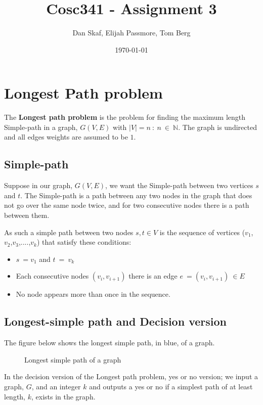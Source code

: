 \documentclass[a4paper,11pt]{article}
\title{Cosc341 - Assignment 3}
\author{Dan Skaf, Elijah Passmore, Tom Berg}
\date{\today}
\begin{document}
\maketitle

\section{Longest Path problem}
The \textbf{Longest path problem} is the problem for finding the maximum length 
Simple-path in a graph, $G(V,E)$ with $\left|V\right|=n\::\:n\:\in\:\mathbb{N}$.
The graph is undirected and all edges weights are assumed to be $1$.

    \subsection{Simple-path} 
    Suppose in our graph, $G(V,E)$, we want the Simple-path between two vertices 
    $s$ and $t$. The Simple-path is a path between any two nodes in the graph 
    that does not go over the same node twice, and for two consecutive nodes 
    there is a path between them.

    As such a simple path between two nodes $s,t\in V$ is the sequence of 
    vertices ($v_1$,$v_2$,$v_3$,$....$,$v_k$) that satisfy these conditions:
    \begin{itemize}
        \item $s\:=v_1$ and $t\:=\:v_k$
        \item Each consecutive nodes $\left(v_i,v_{i+1}\right)$ there is an 
        edge $e\:=\left(v_i,v_{i+1}\right)\:\in E$
        \item No node appears more than once in the sequence.
    \end{itemize}

    \subsection{Longest-simple path and Decision version}
    The figure below shows the longest simple path, in blue, of a graph.
    \begin{figure}[!h]
        \centering {}
        \caption{Longest simple path of a graph}
    \end{figure}

    In the decision version of the Longest path problem, yes or no version; 
    we input a graph, $G$, and an integer $k$ and outputs a yes or no if a 
    simplest path of at least length, $k$, exists in the graph.
\end{document}
